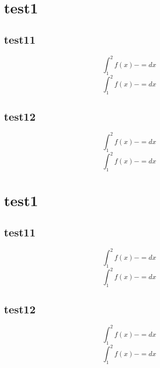 \documentclass[fleqn]{article}
\numberwithin{equation}{section}
\begin{document}
\section{test1}

\subsection{test11}
\begin{equation}
  \int_1^2f(x) -= dx
\end{equation}
\begin{equation}
  \int_1^2f(x) -= dx
\end{equation}

\subsection{test12}
\begin{equation}
  \int_1^2f(x) -= dx
\end{equation}
\begin{equation}
  \int_1^2f(x) -= dx
\end{equation}

\section{test1}


\subsection{test11}
\begin{equation}
  \int_1^2f(x) -= dx
\end{equation}
\begin{equation}
  \int_1^2f(x) -= dx
\end{equation}

\subsection{test12}
\begin{equation}
  \int_1^2f(x) -= dx
\end{equation}
\begin{equation}
  \int_1^2f(x) -= dx
\end{equation}
\end{document}
